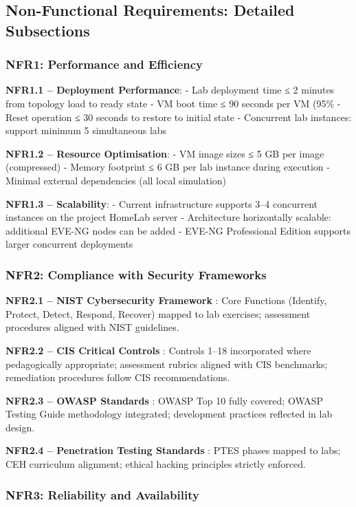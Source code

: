 \subsection{Non-Functional Requirements: Detailed Subsections}

\subsubsection{NFR1: Performance and Efficiency}

\textbf{NFR1.1 -- Deployment Performance}: - Lab deployment time ≤ 2 minutes from topology load to ready state - VM boot time ≤ 90 seconds per VM (95\% - Reset operation ≤ 30 seconds to restore to initial state - Concurrent lab instances: support minimum 5 simultaneous labs

\textbf{NFR1.2 -- Resource Optimisation}: - VM image sizes ≤ 5 GB per image (compressed) - Memory footprint ≤ 6 GB per lab instance during execution - Minimal external dependencies (all local simulation)

\textbf{NFR1.3 -- Scalability}: - Current infrastructure supports 3--4 concurrent instances on the project HomeLab server - Architecture horizontally scalable: additional EVE-NG nodes can be added - EVE-NG Professional Edition supports larger concurrent deployments

\subsubsection{NFR2: Compliance with Security Frameworks}

\textbf{NFR2.1 -- NIST Cybersecurity Framework} : Core Functions (Identify, Protect, Detect, Respond, Recover) mapped to lab exercises; assessment procedures aligned with NIST guidelines.

\textbf{NFR2.2 -- CIS Critical Controls} : Controls 1--18 incorporated where pedagogically appropriate; assessment rubrics aligned with CIS benchmarks; remediation procedures follow CIS recommendations.

\textbf{NFR2.3 -- OWASP Standards} : OWASP Top 10 fully covered; OWASP Testing Guide methodology integrated; development practices reflected in lab design.

\textbf{NFR2.4 -- Penetration Testing Standards} : PTES phases mapped to labs; CEH curriculum alignment; ethical hacking principles strictly enforced.

\subsubsection{NFR3: Reliability and Availability}

